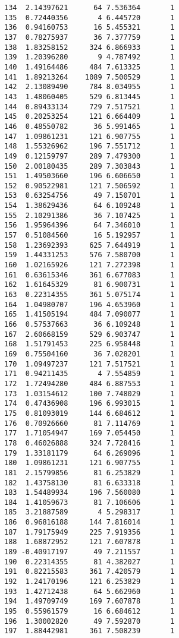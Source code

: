 \documentclass[
  letterpaper,
  DIV=11,
  numbers=noendperiod]{scrreprt}
\begin{document}
\begin{verbatim}
134  2.14397621      64 7.536364       1
135  0.72440356       4 6.445720       1
136  0.94160753      16 5.455321       1
137  0.78275937      36 7.377759       1
138  1.83258152     324 6.866933       1
139  1.20396280       9 4.787492       1
140  1.49164486     484 7.613325       1
141  1.89213264    1089 7.500529       1
142  2.13089490     784 8.034955       1
143  1.48060405     529 6.813445       1
144  0.89433134     729 7.517521       1
145  0.20253254     121 6.664409       1
146  0.48550782      36 5.991465       1
147  1.09861231     121 6.907755       1
148  1.55326962     196 7.551712       1
149  0.12159797     289 7.479300       1
150  2.00180435     289 7.303843       1
151  1.49503660     196 6.606650       1
152  0.90522981     121 7.506592       1
153  0.63254756      49 7.150701       1
154  1.38629436      64 6.109248       1
155  2.10291386      36 7.107425       1
156  1.95964396      64 7.346010       1
157  0.51084560      16 5.192957       1
158  1.23692393     625 7.644919       1
159  1.44331253     576 7.580700       1
160  1.02165926     121 7.272398       1
161  0.63615346     361 6.677083       1
162  1.61645329      81 6.900731       1
163  0.22314355     361 5.075174       1
164  1.04980707     196 4.653960       1
165  1.41505194     484 7.090077       1
166  0.57537663      36 6.109248       1
167  2.60668159     529 6.903747       1
168  1.51791453     225 6.958448       1
169  0.75504160      36 7.028201       1
170  1.09497237     121 7.517521       1
171  0.94211435       4 7.554859       1
172  1.72494280     484 6.887553       1
173  1.03154612     100 7.748029       1
174  0.47436908     196 6.993015       1
175  0.81093019     144 6.684612       1
176  0.70926660      81 7.114769       1
177  1.71054947     169 7.054450       1
178  0.46026888     324 7.728416       1
179  1.33181179      64 6.269096       1
180  1.09861231     121 6.907755       1
181  2.15799856      81 6.253829       1
182  1.43758130      81 6.633318       1
183  1.54489934     196 7.560080       1
184  1.41059673      81 7.106606       1
185  3.21887589       4 5.298317       1
186  0.96816188     144 7.816014       1
187  1.79175949     225 7.919356       1
188  1.68872952     121 7.607878       1
189 -0.40917197      49 7.211557       1
190  0.22314355      81 4.382027       1
191  0.82215583     361 7.420579       1
192  1.24170196     121 6.253829       1
193  1.42712438      64 5.662960       1
194  1.49709749     169 7.607878       1
195  0.55961579      16 6.684612       1
196  1.30002820      49 7.592870       1
197  1.88442981     361 7.508239       1

\end{verbatim}
\end{document}
